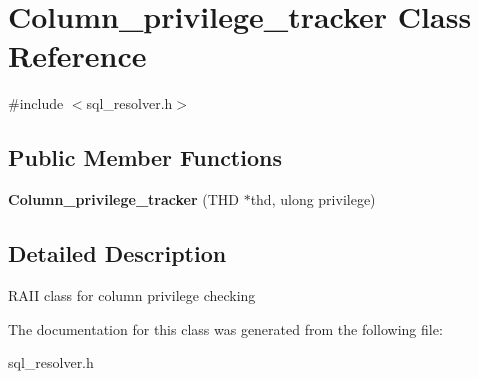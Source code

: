 \hypertarget{classColumn__privilege__tracker}{}\section{Column\+\_\+privilege\+\_\+tracker Class Reference}
\label{classColumn__privilege__tracker}


{\ttfamily \#include $<$sql\+\_\+resolver.\+h$>$}

\subsection*{Public Member Functions}
\begin{DoxyCompactItemize}
\item 
\mbox{\label{classColumn__privilege__tracker_adb6ce368654bd53edfe94f1c93147494}} 
{\bfseries Column\+\_\+privilege\+\_\+tracker} (T\+HD $\ast$thd, ulong privilege)
\end{DoxyCompactItemize}


\subsection{Detailed Description}
R\+A\+II class for column privilege checking 

The documentation for this class was generated from the following file\+:\begin{DoxyCompactItemize}
\item 
sql\+\_\+resolver.\+h\end{DoxyCompactItemize}
